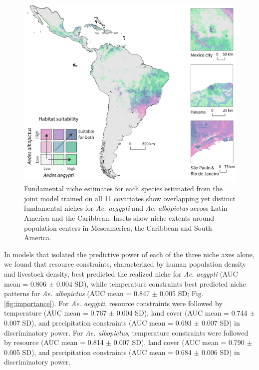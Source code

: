 \begin{figure}[!ht]
\includegraphics[width=\textwidth]{figures/ch3-map-aedes.pdf}
\centering
\caption[Fundamental niche estimates for each species estimated from the joint model trained on all 11 covariates show overlapping yet distinct fundamental niches for \textit{Ae. aegypti} and \textit{Ae. albopictus} across Latin America and the Caribbean.]{Fundamental niche estimates for each species estimated from the joint model trained on all 11 covariates show overlapping yet distinct fundamental niches for \textit{Ae. aegypti} and \textit{Ae. albopictus} across Latin America and the Caribbean. Insets show niche extents around population centers in Mesoamerica, the Caribbean and South America.}
\label{fig:map-aedes}
\end{figure}

In models that isolated the predictive power of each of the three niche axes alone, we found that resource constraints, characterized by human population density and livestock density, best predicted the realized niche for \textit{Ae. aegypti} (AUC mean = 0.806 $\pm$ 0.004 SD), while temperature constraints best predicted niche patterns for \textit{Ae. albopictus} (AUC mean = 0.847 $\pm$ 0.005 SD; Fig. \ref{fig:importance}). For \textit{Ae. aegypti}, resource constraints were followed by temperature (AUC mean = 0.767 $\pm$ 0.004 SD), land cover (AUC mean = 0.744 $\pm$ 0.007 SD), and precipitation constraints (AUC mean = 0.693 $\pm$ 0.007 SD) in discriminatory power. For \textit{Ae. albopictus}, temperature constraints were followed by resource (AUC mean = 0.814 $\pm$ 0.007 SD), land cover (AUC mean = 0.790 $\pm$ 0.005 SD), and precipitation constraints (AUC mean = 0.684 $\pm$ 0.006 SD) in discriminatory power.

